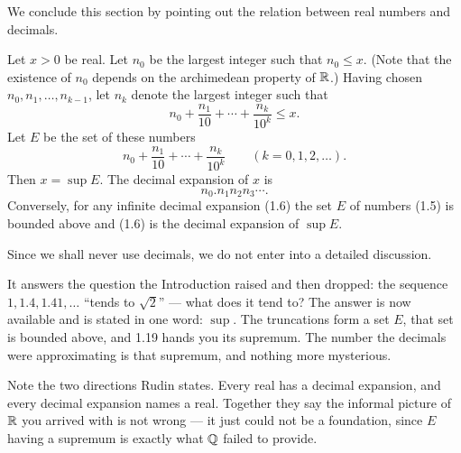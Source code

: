 We conclude this section by pointing out the relation between real numbers and
decimals.

Let $x > 0$ be real. Let $n_0$ be the largest integer such that $n_0 \le x$.
(Note that the existence of $n_0$ depends on the archimedean property of
$\mathbb{R}$.) Having chosen $n_0, n_1, \dots, n_{k-1}$, let $n_k$ denote the largest
integer such that
\[ n_0 + \frac{n_1}{10} + \cdots + \frac{n_k}{10^k} \le x. \]
Let $E$ be the set of these numbers
\begin{equation}
  n_0 + \frac{n_1}{10} + \cdots + \frac{n_k}{10^k}
  \qquad (k = 0,1,2,\dots). \tag{1.5}
\end{equation}
Then $x = \sup E$. The decimal expansion of $x$ is
\begin{equation}
  n_0.n_1n_2n_3\cdots. \tag{1.6}
\end{equation}
Conversely, for any infinite decimal expansion (1.6) the set $E$ of numbers
(1.5) is bounded above and (1.6) is the decimal expansion of $\sup E$.

Since we shall never use decimals, we do not enter into a detailed
discussion.

\begin{deeper}
It answers the question the Introduction raised and then dropped: the sequence
$1, 1.4, 1.41, \dots$ ``tends to $\sqrt2$'' --- what does it tend to? The answer
is now available and is stated in one word: $\sup$. The truncations form a set
$E$, that set is bounded above, and 1.19 hands you its supremum. The number the
decimals were approximating is that supremum, and nothing more mysterious.

Note the two directions Rudin states. Every real has a decimal expansion, and
every decimal expansion names a real. Together they say the informal picture of
$\mathbb{R}$ you arrived with is not wrong --- it just could not be a foundation, since
$E$ having a supremum is exactly what $\mathbb{Q}$ failed to provide.
\end{deeper}
